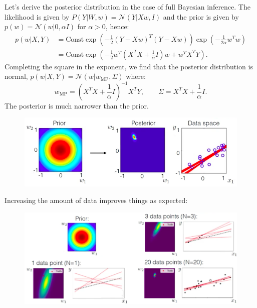 Let's derive the posterior distribution in the case of full Bayesian inference. The likelihood is given by $P(Y|W,w) = \mathcal{N}(Y | Xw, I)$ and the prior is given by $p(w) = \mathcal{N}(w|0,\alpha I)$ for $\alpha > 0$, hence:
\begin{align*}
p(w|X,Y) &= \textrm{Const} \exp\left( - \frac{1}{2} (Y - Xw)^T (Y - Xw) \right) \exp\left( - \frac{1}{2 \alpha} w^T w \right)\\[1.5ex]
&= \textrm{Const} \exp\left( -\frac{1}{2} w^T \left(X^T X + \frac{1}{\alpha} I \right) w + w^T X^T Y \right).
\end{align*}
Completing the square in the exponent, we find that the posterior distribution is normal, $p(w|X,Y) = \mathcal{N}(w|w_{\text{MP}}, \Sigma)$ where:
\begin{equation*}
w_{\text{MP}} = \left(X^T X + \frac{1}{\alpha} I \right)^{-1} X^T Y, \qquad \Sigma = X^T X + \frac{1}{\alpha} I.
\end{equation*}
The posterior is much narrower than the prior.
\begin{figure}[H]
\centering
\includegraphics[scale=0.3]{bayesianlineartraining.png}
\end{figure}


\newpage
Increasing the amount of data improves things as expected:
\begin{figure}[H]
\centering
\includegraphics[scale=0.4]{morebayesiandata.png}
\end{figure}

\minirule

